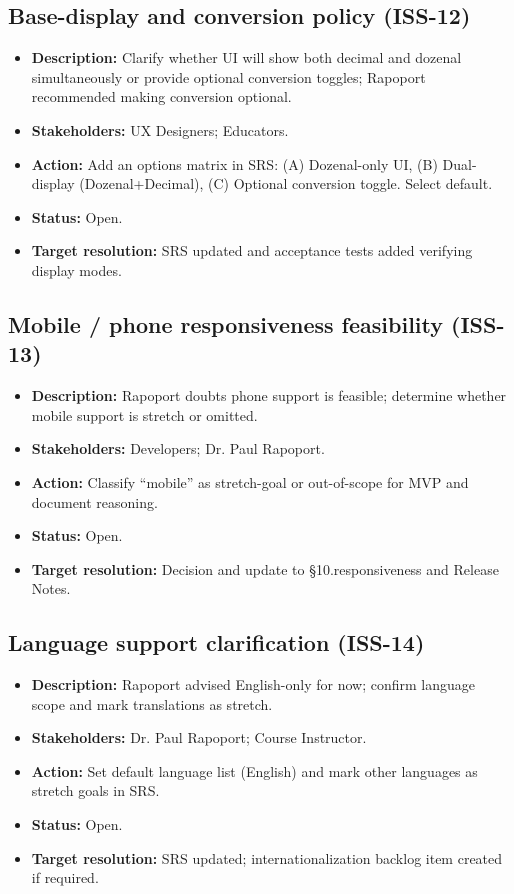 \documentclass[12pt]{article}
\begin{document}
\subsection{Base-display and conversion policy (ISS-12)}
\begin{itemize}
  \item \textbf{Description:} Clarify whether UI will show both decimal and dozenal simultaneously or provide optional conversion toggles; Rapoport recommended making conversion optional.
  \item \textbf{Stakeholders:} UX Designers; Educators.
  \item \textbf{Action:} Add an options matrix in SRS: (A) Dozenal-only UI, (B) Dual-display (Dozenal+Decimal), (C) Optional conversion toggle. Select default.
  \item \textbf{Status:} Open.
  \item \textbf{Target resolution:} SRS updated and acceptance tests added verifying display modes.
\end{itemize}

\subsection{Mobile / phone responsiveness feasibility (ISS-13)}
\begin{itemize}
  \item \textbf{Description:} Rapoport doubts phone support is feasible; determine whether mobile support is stretch or omitted.
  \item \textbf{Stakeholders:} Developers; Dr. Paul Rapoport.
  \item \textbf{Action:} Classify “mobile” as stretch-goal or out-of-scope for MVP and document reasoning.
  \item \textbf{Status:} Open.
  \item \textbf{Target resolution:} Decision and update to \S10.responsiveness and Release Notes.
\end{itemize}

\subsection{Language support clarification (ISS-14)}
\begin{itemize}
  \item \textbf{Description:} Rapoport advised English-only for now; confirm language scope and mark translations as stretch.
  \item \textbf{Stakeholders:} Dr. Paul Rapoport; Course Instructor.
  \item \textbf{Action:} Set default language list (English) and mark other languages as stretch goals in SRS.
  \item \textbf{Status:} Open.
  \item \textbf{Target resolution:} SRS updated; internationalization backlog item created if required.
\end{itemize}
\end{document}
